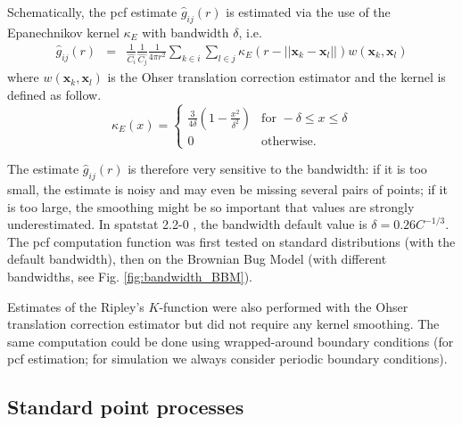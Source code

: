 \documentclass[english]{article}
\newcommand{\bx}{\boldsymbol{x}}
\begin{document}
Schematically, the pcf estimate $\hat{g}_{ij}(r)$ is estimated via
the use of the Epanechnikov kernel $\kappa_{E}$ with bandwidth $\delta$,
i.e.
\begin{equation}
\begin{array}{ccc}
\hat{g}_{ij}(r) & = & \frac{1}{\hat{C_{i}}}\frac{1}{\hat{C_{j}}}\frac{1}{4\pi r^{2}}\sum_{k\in i}\sum_{l \in j}\kappa_{E}(r-||\bx_{k}-\bx_{l}||)w(\bx_{k},\bx_{l})\end{array}\label{eq:pcf_estimate}
\end{equation}
where $w(\bx_{k},\bx_{l})$ is the Ohser translation correction estimator
\citep{ohser_estimators_1983} and the kernel is defined as follow.
\begin{equation}
\kappa_{E}(x)=\begin{cases}
\frac{3}{4\delta}\left(1-\frac{x^{2}}{\delta^{2}}\right) & \text{for }-\delta\leq x\leq\delta\\
0 & \text{otherwise}.
\end{cases}
\end{equation}

The estimate $\hat{g}_{ij}(r)$ is therefore very sensitive to the
bandwidth: if it is too small, the estimate is noisy and may even
be missing several pairs of points; if it is too large, the smoothing
might be so important that values are strongly underestimated. In
spatstat 2.2-0 \citep{baddeley_spatstat}, the bandwidth default value
is $\delta=0.26C^{-1/3}$. The pcf computation function was first
tested on standard distributions (with the default bandwidth), then
on the Brownian Bug Model (with different bandwidths, see Fig. \ref{fig:bandwidth_BBM}).

Estimates of the Ripley's $K$-function were also performed with the
Ohser translation correction estimator  but did not require any kernel
smoothing. The same computation could be done using wrapped-around
boundary conditions (for pcf estimation; for simulation we always
consider periodic boundary conditions).

\subsection{Standard point processes}
\end{document}
